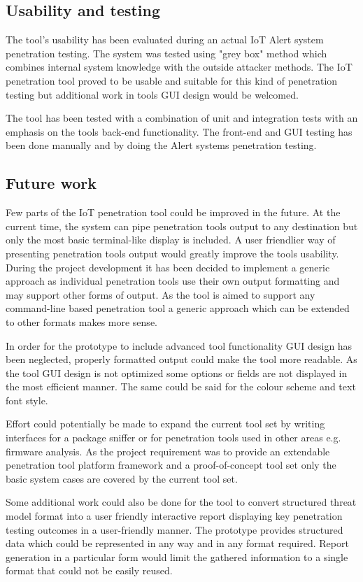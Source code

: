 	\subsection{Usability and testing}
	The tool's usability has been evaluated during an actual IoT Alert system penetration testing. The system was tested using "grey box" method which combines internal system knowledge with the outside attacker methods. The IoT penetration tool proved to be usable and suitable for this kind of penetration testing but additional work in tools GUI design would be welcomed.
	
	The tool has been tested with a combination of unit and integration tests with an emphasis on the tools back-end functionality. The front-end and GUI testing has been done manually and by doing the Alert systems penetration testing.
	
	\subsection{Future work}\label{future-work}
	Few parts of the IoT penetration tool could be improved in the future. At the current time, the system can pipe penetration tools output to any destination but only the most basic terminal-like display is included. A user friendlier way of presenting penetration tools output would greatly improve the tools usability. During the project development it has been decided to implement a generic approach as individual penetration tools use their own output formatting and may support other forms of output. As the tool is aimed to support any command-line based penetration tool a generic approach which can be extended to other formats makes more sense. 
	
	In order for the prototype to include advanced tool functionality GUI design has been neglected, properly formatted output could make the tool more readable. As the tool GUI design is not optimized some options or fields are not displayed in the most efficient manner. The same could be said for the colour scheme and text font style.
	
	Effort could potentially be made to expand the current tool set by writing interfaces for a package sniffer or for penetration tools used in other areas e.g. firmware analysis. As the project requirement was to provide an extendable penetration tool platform framework and a proof-of-concept tool set only the basic system cases are covered by the current tool set. 
	 
	Some additional work could also be done for the tool to convert structured threat model format into a user friendly interactive report displaying key penetration testing outcomes in a user-friendly manner. The prototype provides structured data which could be represented in any way and in any format required. Report generation in a particular form would limit the gathered information to a single format that could not be easily reused. 
	
